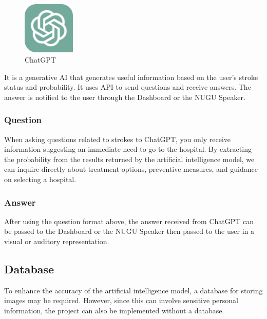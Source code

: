 \begin{figure}[htp]
\centering
\includegraphics[width=2.5cm]{images/chatgpt.png}
\caption{ChatGPT}
\label{fig:chatgpt}
\end{figure}

It is a generative AI that generates useful information based on the user's stroke status and probability. It uses API to send questions and receive answers. The answer is notified to the user through the Dashboard or the NUGU Speaker.\\
\subsubsection{\textbf{Question}}
When asking questions related to strokes to ChatGPT, you only receive information suggesting an immediate need to go to the hospital. By extracting the probability from the results returned by the artificial intelligence model, we can inquire directly about treatment options, preventive measures, and guidance on selecting a hospital.\\
\subsubsection{\textbf{Answer}}
After using the question format above, the answer received from ChatGPT can be passed to the Dashboard or the NUGU Speaker then passed to the user in a visual or auditory representation.\\

\subsection{\textbf{Database}}
To enhance the accuracy of the artificial intelligence model, a database for storing images may be required. However, since this can involve sensitive personal information, the project can also be implemented without a database.\\